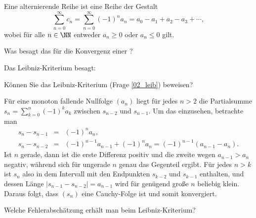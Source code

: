 \begin{antwort}
  Eine alternierende Reihe ist eine Reihe der Gestalt
  \[
  \sum_{n=0}^\infty c_n = \sum_{n=0}^\infty (-1)^n a_n=a_0-a_1+a_2 - a_3+\cdots, 
  \]
  wobei für alle $n\in\NN$ entweder $a_n\ge0$ oder $a_n\le0$ gilt.\AntEnd
\end{antwort}

\begin{frage}\label{02_leib}
  Was besagt das  für die Konvergenz einer 
  ?
\end{frage}

\begin{antwort}
  Das Leibniz-Kriterium besagt: 

  \medskip\noindent
\end{antwort}

\begin{frage}
  Können Sie das Leibniz-Kriterium (Frage \ref{02_leib}) beweisen?
\end{frage}

\begin{antwort}
  Für eine monoton fallende Nullfolge $(a_n)$ liegt 
  für jedes $n>2$ die Partialsumme $s_n= \sum_{k=0}^n (-1)^k a_k$
  zwischen $s_{n-2}$ und $s_{n-1}$. Um das einzusehen, betrachte man
  \begin{eqnarray*}
    s_n - s_{n-1} &=& (-1)^n a_n,  \\
    s_n - s_{n-2} &=& (-1)^{n-1} a_{n-1} +(-1)^n a_n 
    = (-1)^{n-1} ( a_{n-1}-a_n ).
  \end{eqnarray*} 
  Ist $n$ gerade, dann ist die erste Differenz positiv und die zweite 
  wegen $a_{n-1} > a_n$ negativ, während sich für ungerade $n$ genau das 
  Gegenteil ergibt. Für jedes $n>k$ ist $s_n$ also in dem Intervall mit den 
  Endpunkten $s_{k-2}$ und $s_{k-1}$ enthalten, und dessen Länge 
  $|s_{n-1}-s_{n-2}|=a_{n-1}$ wird 
  für genügend große $n$ beliebig klein. Daraus folgt, 
  dass $(s_n)$ eine Cauchy-Folge ist und somit konvergiert.
  \AntEnd
\end{antwort}

\begin{frage}\label{02_leiba}
  Welche Fehlerabschätzung erhält man beim Leibniz-Kriterium?
\end{frage}


